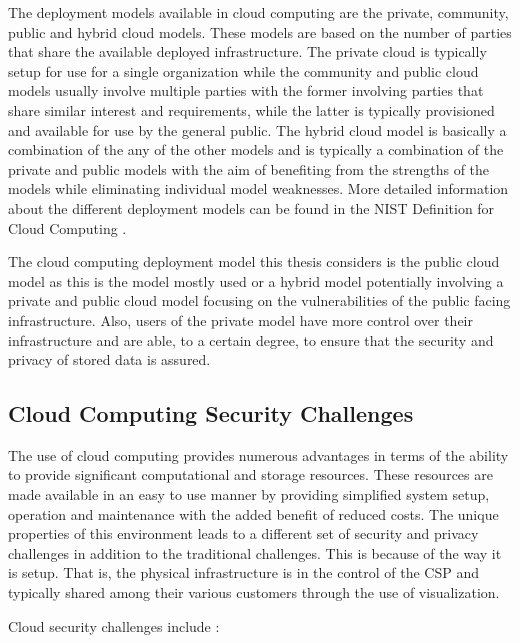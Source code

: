 The deployment models available in cloud computing are the private, community, public and hybrid cloud models. These models are based on the number of parties that share the available deployed infrastructure. The private cloud is typically setup for use for a single organization while the community and public cloud models usually involve multiple parties with the former involving parties that share similar interest and requirements, while the latter is typically provisioned and available for use by the general public. The hybrid cloud model is basically a combination of the any of the other models and is typically a combination of the private and public models with the aim of benefiting from the strengths of the models while eliminating individual model weaknesses. More detailed information about the different deployment models can be found in the NIST Definition for Cloud Computing \cite{nist}.

The cloud computing deployment model this thesis considers is the public cloud model as this is the model mostly used or a hybrid model potentially involving a private and public cloud model focusing on the vulnerabilities of the public facing infrastructure. Also, users of the private model have more control over their infrastructure and are able, to a certain degree, to ensure that the security and privacy of stored data is assured.

\subsection*{Cloud Computing Security Challenges}

The use of cloud computing provides numerous advantages in terms of the ability to provide significant computational and storage resources. These resources are made available in an easy to use manner by providing simplified system setup, operation and maintenance with the added benefit of reduced costs. The unique properties of this environment leads to a different set of security and privacy challenges in addition to the traditional challenges. This is because of the way it is setup. That is, the physical infrastructure is in the control of the CSP and typically shared among their various customers through the use of visualization.

Cloud security challenges include \cite{Rong2013}:

